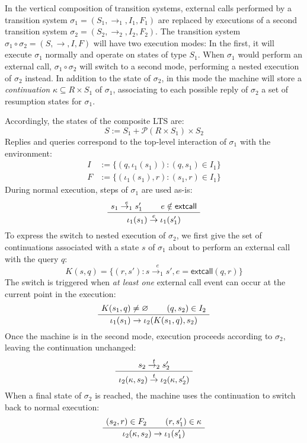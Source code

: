 \documentclass[sigplan,10pt,review,anonymous]{acmart}
\newcommand{\kw}[1]{\ensuremath{ \textsf{#1} }}
\begin{document}
In the vertical composition of transition systems,
external calls performed by a transition system
$\sigma_1 = (S_1, \rightarrow_1, I_1, F_1)$
are replaced by executions of a second transition system
$\sigma_2 = (S_2, \rightarrow_2, I_2, F_2)$.
The transition system
$\sigma_1 \circ \sigma_2 = (S, \rightarrow, I, F)$
will have two execution modes:
In the first,
it will execute $\sigma_1$ normally and
operate on states of type $S_1$.
When $\sigma_1$ would perform an external call,
$\sigma_1 \circ \sigma_2$ will switch to a second mode,
performing a nested execution of $\sigma_2$ instead.
In addition to the state of $\sigma_2$,
in this mode the machine will store a \emph{continuation}
$\kappa \subseteq R \times S_1$
of $\sigma_1$,
associating to each possible reply of $\sigma_2$
a set of resumption states for $\sigma_1$.

Accordingly,
the states of the composite LTS are:
\[
  S := S_1 + \mathcal{P}(R \times S_1) \times S_2
\]
Replies and queries
correspond to the top-level interaction of $\sigma_1$ with the environment:
\begin{align*}
  I &:= \{ (q, \iota_1(s_1)) : (q, s_1) \in I_1 \} \\
  F &:= \{ (\iota_1(s_1), r) : (s_1, r) \in I_1 \}
\end{align*}
During normal execution,
steps of $\sigma_1$ are used as-is:
\[
  \AxiomC{$s_1 \stackrel{e}{\rightarrow_1} s_1'$}
  \AxiomC{$e \notin \kw{extcall}$}
  \BinaryInfC{$\iota_1(s_1) \stackrel{e}{\rightarrow} \iota_1(s_1')$}
  \DisplayProof
\]
To express the switch to nested execution of $\sigma_2$,
we first give the set of continuations associated with a state $s$ of $\sigma_1$
about to perform an external call with the query $q$:
\[
  K(s, q) =
    \{ (r, s') : s \stackrel{e}{\rightarrow_1} s',
                     e = \kw{extcall}(q, r) \}
\]
The switch is triggered when \emph{at least one} external call event
can occur at the current point in the execution:
\[
  \AxiomC{$K(s_1, q) \ne \varnothing$}
  \AxiomC{$(q, s_2) \in I_2$}
  \BinaryInfC{$\iota_1(s_1) \rightarrow \iota_2(K(s_1, q), s_2)$}
  \DisplayProof
\]
Once the machine is in the second mode,
execution proceeds according to $\sigma_2$,
leaving the continuation unchanged:
\[
  \AxiomC{$s_2 \stackrel{t}{\rightarrow_2} s_2'$}
  \UnaryInfC{$
    \iota_2(\kappa, s_2)
    \stackrel{t}{\rightarrow}
    \iota_2(\kappa, s_2')$}
  \DisplayProof
\]
When a final state of $\sigma_2$ is reached,
the machine uses the continuation to switch back
to normal execution:
\[
  \AxiomC{$(s_2, r) \in F_2$}
  \AxiomC{$(r, s_1') \in \kappa$}
  \BinaryInfC{$\iota_2(\kappa, s_2) \rightarrow \iota_1(s_1')$}
  \DisplayProof
\]
\end{document}
